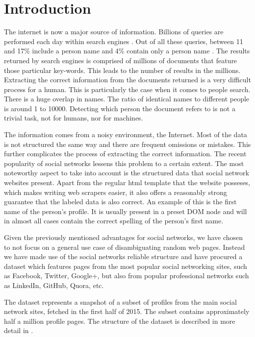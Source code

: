\chapter{Introduction}
\label{chapter:intro}

The internet is now a major source of information. Billions of queries are performed
each day within search engines \cite{search-stats}. Out of all these queries, between 11 and 17\%
include a person name and 4\% contain only a person name \cite{weps2-eval}\cite{weps3-eval}.
The results returned by search engines is comprised of millions of documents 
that feature those particular key-words. This leads to the number of results 
in the millions. Extracting the correct information from the documents returned 
is a very difficult process for a human. This is particularly the case when it 
comes to people search. There is a huge overlap in names. The ratio of identical 
names to different people is around 1 to 10000. Detecting which person the document 
refers to is not a trivial task, not for humans, nor for machines.

The information comes from a noisy environment, the Internet. Most of the data
is not structured the same way and there are frequent omissions or mistakes.
This further complicates the process of extracting the correct information.
The recent popularity of social networks lessens this problem to a certain
extent. \cite{social-networks} The most noteworthy aspect to take into account is 
the structured data that social network websites present. \cite{social-networks-scraping}
Apart from the regular html template that the website posseses, which makes writing
web scrapers easier, it also offers a reasonably strong guarantee that the labeled
data is also correct. An example of this is the first name of the person's profile.
It is usually present in a preset DOM node and will in almost all cases contain
the correct spelling of the person's first name.

Given the previously mentioned advantages for social networks, we have chosen
to not focus on a general use case of disambiguating random web pages. Instead
we have made use of the social networks reliable structure and have procured
a dataset which features pages from the most popular social networking sites,
such as Facebook, Twitter, Google+, but also from popular professional networks
such as LinkedIn, GitHub, Quora, etc.

The dataset represents a snapshot of a subset of profiles from the main
social network sites, fetched in the first half of 2015. The subset contains
approximately half a million profile pages. The structure of the dataset
is described in more detail in .

